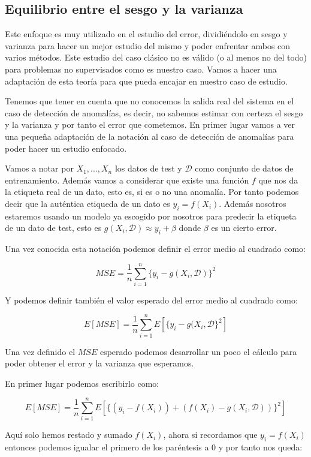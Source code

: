 \subsection{Equilibrio entre el sesgo y la varianza}

Este enfoque es muy utilizado en el estudio del error, dividiéndolo en sesgo y varianza para hacer un mejor estudio del mismo y poder enfrentar ambos con varios métodos. Este estudio del caso clásico no es válido (o al menos no del todo) para problemas no supervisados como es nuestro caso. Vamos a hacer una adaptación de esta teoría para que pueda encajar en nuestro caso de estudio.

Tenemos que tener en cuenta que no conocemos la salida real del sistema en el caso de detección de anomalías, es decir, no sabemos estimar con certeza el sesgo y la varianza y por tanto el error que cometemos. En primer lugar vamos a ver una pequeña adaptación de la notación al caso de detección de anomalías para poder hacer un estudio enfocado.

Vamos a notar por $X_1 , ... , X_n$ los datos de test y $\mathcal{D}$ como conjunto de datos de entrenamiento. Además vamos a considerar que existe una función $f$ que nos da la etiqueta real de un dato, esto es, si es o no una anomalía. Por tanto podemos decir que la auténtica etiqueda de un dato es $y_i = f(X_i)$. Además nosotros estaremos usando un modelo ya escogido por nosotros para predecir la etiqueta de un dato de test, esto es $g(X_i, \mathcal{D})\approx y_i+\beta$ donde $\beta$ es un cierto error.

Una vez conocida esta notación podemos definir el error medio al cuadrado como:

$$MSE = \frac{1}{n}\sum_{i=1}^{n}\{y_i - g(X_i, \mathcal{D})\}^2$$

Y podemos definir también el valor esperado del error medio al cuadrado como:

$$E[MSE] = \frac{1}{n} \sum_{i=1}^{n}E[\{y_i - g(X_i, \mathcal{D}\}^2]$$

Una vez definido el $MSE$ esperado podemos desarrollar un poco el cálculo para poder obtener el error y la varianza que esperamos.

En primer lugar podemos escribirlo como:

$$E[MSE] = \frac{1}{n}\sum_{i=1}^{n}E[\{ (y_i-f(X_i)) + (f(X_i) - g(X_i,\mathcal{D})) \}^2]$$

Aquí solo hemos restado y sumado $f(X_i)$, ahora si recordamos que $y_i = f(X_i)$ entonces podemos igualar el primero de los paréntesis a $0$ y por tanto nos queda:

